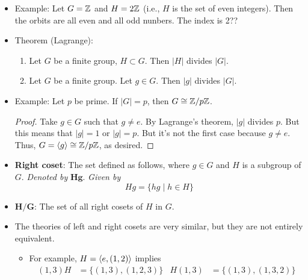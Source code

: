 \documentclass[../notes.tex]{subfiles}
\begin{document}
\begin{itemize}
    \item Example: Let $G=\mathbb{Z}$ and $H=2\mathbb{Z}$ (i.e., $H$ is the set of even integers). Then the orbits are all even and all odd nunbers. The index is 2??
    \item Theorem (Lagrange):
    \begin{enumerate}
        \item Let $G$ be a finite group, $H\subset G$. Then $|H|$ divides $|G|$.
        \item Let $G$ be a finite group. Let $g\in G$. Then $|g|$ divides $|G|$.
    \end{enumerate}
    \item Example: Let $p$ be prime. If $|G|=p$, then $G\cong\mathbb{Z}/p\mathbb{Z}$.
    \begin{proof}
        Take $g\in G$ such that $g\neq e$. By Lagrange's theorem, $|g|$ divides $p$. But this means that $|g|=1$ or $|g|=p$. But it's not the first case because $g\neq e$. Thus, $G=\left\langle{g}\right\rangle\cong\mathbb{Z}/p\mathbb{Z}$, as desired.
    \end{proof}
    \item \textbf{Right coset}: The set defined as follows, where $g\in G$ and $H$ is a subgroup of $G$. \emph{Denoted by} $\bm{Hg}$. \emph{Given by}
    \begin{equation*}
        Hg = \{hg\mid h\in H\}
    \end{equation*}
    \item $\bm{H/G}$: The set of all right cosets of $H$ in $G$.
    \item The theories of left and right cosets are very similar, but they are not entirely equivalent.
    \begin{itemize}
        \item For example, $H=\left\langle{e,(1,2)}\right\rangle$ implies
        \begin{align*}
            (1,3)H &= \{(1,3),(1,2,3)\}&
            H(1,3) &= \{(1,3),(1,3,2)\}
        \end{align*}
    \end{itemize}
\end{itemize}
\end{document}

